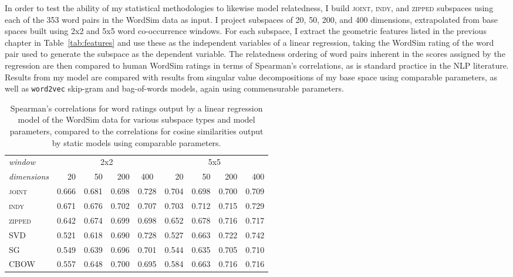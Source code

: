 In order to test the ability of my statistical methodologies to likewise model relatedness, I build \textsc{joint}, \textsc{indy}, and \textsc{zipped} subspaces using each of the 353 word pairs in the WordSim data as input.  I project subspaces of 20, 50, 200, and 400 dimensions, extrapolated from base spaces built using 2x2 and 5x5 word co-occurrence windows.  For each subspace, I extract the geometric features listed in the previous chapter in Table~\ref{tab:features} and use these as the independent variables of a linear regression, taking the WordSim rating of the word pair used to generate the subspace as the dependent variable.  The relatedness ordering of word pairs inherent in the scores assigned by the regression are then compared to human WordSim ratings in terms of Spearman's correlations, as is standard practice in the NLP literature.  Results from my model are compared with results from singular value decompositions of my base space using comparable parameters, as well as \texttt{word2vec} skip-gram and bag-of-words models, again using commensurable parameters.

\begin{table}
\centering
\begin{tabular}{lrrrr|rrrr}
\hline
\emph{window} & \multicolumn{4}{c}{2x2} & \multicolumn{4}{c}{5x5} \\
\emph{dimensions} & 20 & 50 & 200 & \multicolumn{1}{c}{400} & 20 & 50 & 200 & 400 \\
\hline
\textsc{joint} & 0.666 & 0.681 & 0.698 & 0.728 & 0.704 & 0.698 & 0.700 & 0.709 \\
\textsc{indy} & 0.671 & 0.676 & 0.702 & 0.707 & 0.703 & 0.712 & 0.715 & 0.729 \\
\textsc{zipped} & 0.642 & 0.674 & 0.699 & 0.698 & 0.652 & 0.678 & 0.716 & 0.717 \\
\textsc{SVD} & 0.521 & 0.618 & 0.690 & 0.728 & 0.527 & 0.663 & 0.722 & 0.742 \\
\textsc{SG} & 0.549 & 0.639 & 0.696 & 0.701 & 0.544 & 0.635 & 0.705 & 0.710 \\
\textsc{CBOW} & 0.557 & 0.648 & 0.700 & 0.695 & 0.584 & 0.663 & 0.716 & 0.716 \\
\hline
\end{tabular}
\caption{Spearman's correlations for word ratings output by a linear regression model of the WordSim data for various subspace types and model parameters, compared to the correlations for cosine similarities output by static models using comparable parameters.}
\label{tab:related}
\end{table}

